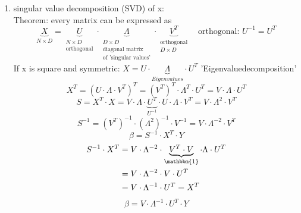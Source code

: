 \documentclass[11pt]{article}
\begin{document}
\begin{itemize}
\begin{enumerate}
        \item singular value decomposition (SVD) of x: \\
        Theorem: every matrix can be expressed as
        \begin{equation*}
          \underbrace{X}_{N \times D} = \underbrace{U}_{\substack{N \times D \\ \text{orthogonal}}} \cdot
          \underbrace{\Lambda}_{\substack{D \times D \\ \text{diagonal matrix} \\
          \text{of 'singular values'}}} \cdot \underbrace{V^T}_{\substack{\text{orthogonal} \\ D \times D}}
          \quad \text{orthogonal: } U^{-1} = U^T
        \end{equation*}
        If x is square and symmetric: $X=U \cdot \underbrace{\Lambda}_{Eigenvalues} \cdot U^T$ 'Eigenvaluedecomposition'
        \begin{equation*}
          X^T = (U \cdot \Lambda \cdot V^T)^T = (V^T)^T\cdot\Lambda^T\cdot U^T = V\cdot\Lambda\cdot U^T
        \end{equation*}
        \begin{equation*}
          S = X^T \cdot X = V \cdot \Lambda \cdot \underbrace{U^T}_{U^{-1}} \cdot
          U \cdot \Lambda \cdot V^T = V \cdot \Lambda^2\cdot V^T
        \end{equation*}
        \begin{equation*}
          S^{-1} = (V^T)^{-1} \cdot (\Lambda^2)^{-1}\cdot V^{-1} = V \cdot
          \Lambda^{-2}\cdot V^T
        \end{equation*}
        \begin{equation*}
          \beta = S^{-1} \cdot X^T \cdot Y
        \end{equation*}
        \begin{equation*}
          \begin{align*}
            S^{-1}\cdot X^T &=V\cdot\Lambda^{-2}\cdot\underbrace{V^T\cdot V}_{\mathbbm{1}}
            \cdot\Lambda\cdot U^T \\
            &= V \cdot \Lambda^{-2} \cdot V \cdot U^T \\
            &= V \cdot \Lambda^{-1}\cdot U^T = X^T
          \end{align*}
        \end{equation*}
        \begin{equation*}
          \boxed{\beta = V\cdot\Lambda^{-1}\cdot U^T \cdot Y}
        \end{equation*}

\end{enumerate}
\end{itemize}
\end{document}
